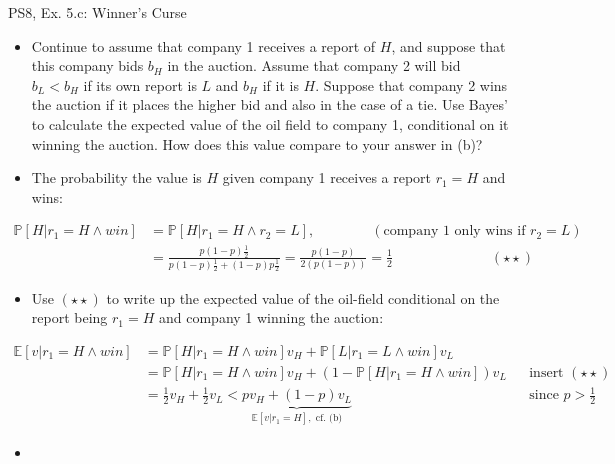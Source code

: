 \begin{frame}{PS8, Ex. 5.c: Winner's Curse}
      \begin{itemize}
        \item[(c)] Continue to assume that company 1 receives a report of $H$, and suppose that this company bids $b_H$ in the auction. Assume that company 2 will bid $b_L < b_H$ if its own report is $L$ and $b_H$ if it is $H$. Suppose that company 2 wins the auction if it places the higher bid and also in the case of a tie. Use Bayes’ to calculate the expected value of the oil field to company 1, conditional on it winning the auction. How does this value compare to your answer in (b)?
        \item[Step 1:] The probability the value is $H$ given company 1 receives a report $r_1=H$ and wins:
        \end{itemize}
        \vspace{-10pt}
        \begin{align*}
          \mathbb{P}[H|r_1=H\wedge win]&=\mathbb{P}[H|r_1=H\wedge r_2=L],\quad\quad\quad\quad(\text{company 1 only wins if }r_2=L)\\
            &=\frac{p(1-p)\frac{1}{2}}{p(1-p)\frac{1}{2}+(1-p)p\frac{1}{2}}=\frac{p(1-p)}{2(p(1-p))}=\frac{1}{2}\quad\quad\quad\quad\quad\quad\quad(\star\star)
        \end{align*}
        \vspace{-12pt}
        \begin{itemize}
        \item[Step 2:] Use $(\star\star)$ to write up the expected value of the oil-field conditional on the report being $r_1=H$ and company 1 winning the auction:
      \end{itemize}
      \vspace{-8pt}
      \begin{align*}
        \mathbb{E}[v|r_1=H\wedge win]&=\mathbb{P}[H|r_1=H\wedge win]v_H+\mathbb{P}[L|r_1=L\wedge win]v_L\\
        &=\mathbb{P}[H|r_1=H\wedge win]v_H+\left(1-\mathbb{P}[H|r_1=H\wedge win]\right)v_L&&\text{insert }(\star\star)\\
        &=\frac{1}{2}v_H+\frac{1}{2}v_L<\underbrace{pv_H+(1-p)v_L}_{\textstyle\mathbb{E}[v|r_1=H],\text{ cf. (b)}}&&\text{since }p>\frac{1}{2}
      \end{align*}
      \vspace{-10pt}
      \begin{itemize}
        \item[Step 3:] 
      \end{itemize}
      \vfill\null
\end{frame}
